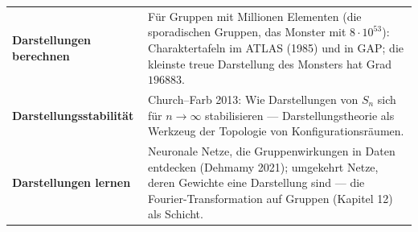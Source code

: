 \begin{forschung}
\begin{center}
{\small
\renewcommand{\arraystretch}{1.45}
\begin{tabular}{@{}P{3.0cm}P{5.2cm}@{}}
\toprule
\textbf{Darstellungen berechnen} & Für Gruppen mit Millionen Elementen (die sporadischen Gruppen, das Monster mit $8\cdot10^{53}$): Charaktertafeln im ATLAS (1985) und in GAP; die kleinste treue Darstellung des Monsters hat Grad $196883$.\\
\textbf{Darstellungs\-stabilität} & Church--Farb 2013: Wie Darstellungen von $S_n$ sich für $n\to\infty$ stabilisieren --- Darstellungstheorie als Werkzeug der Topologie von Konfigurationsräumen.\\
\textbf{Darstellungen lernen} & Neuronale Netze, die Gruppenwirkungen in Daten entdecken (Dehmamy 2021); umgekehrt Netze, deren Gewichte eine Darstellung sind --- die Fourier-Transformation auf Gruppen (Kapitel 12) als Schicht.\\
\bottomrule
\end{tabular}}
\end{center}

\begin{center}
\begin{minipage}{0.88\textwidth}
\end{minipage}
\end{center}
\end{forschung}

